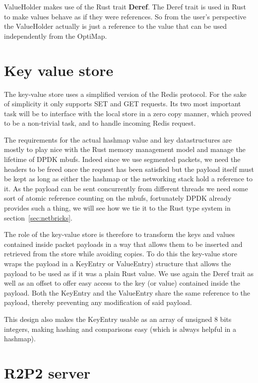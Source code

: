 ValueHolder makes use of the Rust trait \textbf{Deref}. The Deref
trait is used in Rust to make values behave as if they were
references. So from the user's perspective the ValueHolder actually is
just a reference to the value that can be used independently from the
OptiMap.

\section{Key value store}

The key-value store uses a simplified version of the Redis
protocol. For the sake of simplicity it only supports SET and GET
requests. Its two most important task will be to interface with the
local store in a zero copy manner, which proved to be a non-trivial
task, and to handle incoming Redis request.

The requirements for the actual hashmap value and key datastructures
are mostly to play nice with the Rust memory management model and
manage the lifetime of DPDK mbufs. Indeed since we use segmented
packets, we need the headers to be freed once the request has been
satisfied but the payload itself must be kept as long as either the
hashmap or the networking stack hold a reference to it. As the payload
can be sent concurrently from different threads we need some sort of
atomic reference counting on the mbufs, fortunately DPDK already
provides such a thing, we will see how we tie it to the Rust type
system in section~\ref{sec:netbricks}.



The role of the key-value store is therefore to transform the keys and
values contained inside packet payloads in a way that allows them to
be inserted and retrieved from the store while avoiding copies. To do
this the key-value store wraps the payload in a KeyEntry or
ValueEntry) structure that allows the payload to be used as if it was
a plain Rust value. We use again the Deref trait as well as an offset
to offer easy access to the key (or value) contained inside the
payload. Both the KeyEntry and the ValueEntry share the same reference
to the payload, thereby preventing any modification of said payload.

This design also makes the KeyEntry usable as an array of unsigned 8
bits integers, making hashing and comparisons easy (which is always
helpful in a hashmap).

\section{R2P2 server}

